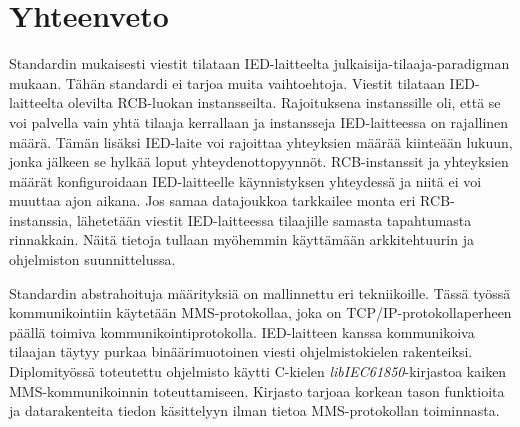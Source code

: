 \section{Yhteenveto}
Standardin mukaisesti viestit tilataan IED-laitteelta julkaisija-tilaaja-paradigman mukaan. Tähän standardi ei tarjoa muita vaihtoehtoja. Viestit tilataan IED-laitteelta olevilta RCB-luokan instansseilta. Rajoituksena instanssille oli, että se voi palvella vain yhtä tilaaja kerrallaan ja instansseja IED-laitteessa on rajallinen määrä. Tämän lisäksi IED-laite voi rajoittaa yhteyksien määrää kiinteään lukuun, jonka jälkeen se hylkää loput yhteydenottopyynnöt. RCB-instanssit ja yhteyksien määrät konfiguroidaan IED-laitteelle käynnistyksen yhteydessä ja niitä ei voi muuttaa ajon aikana. Jos samaa datajoukkoa tarkkailee monta eri RCB-instanssia, lähetetään viestit IED-laitteessa tilaajille samasta tapahtumasta rinnakkain. Näitä tietoja tullaan myöhemmin käyttämään arkkitehtuurin ja ohjelmiston suunnittelussa.

Standardin abstrahoituja määrityksiä on mallinnettu eri tekniikoille. Tässä työssä kommunikointiin käytetään MMS-protokollaa, joka on TCP/IP-protokollaperheen päällä toimiva kommunikointiprotokolla. IED-laitteen kanssa kommunikoiva tilaajan täytyy purkaa binäärimuotoinen viesti ohjelmistokielen rakenteiksi. Diplomityössä toteutettu ohjelmisto käytti C-kielen \emph{libIEC61850}-kirjastoa kaiken MMS-kommunikoinnin toteuttamiseen. Kirjasto tarjoaa korkean tason funktioita ja datarakenteita tiedon käsittelyyn ilman tietoa MMS-protokollan toiminnasta. \mbox{\cite{IEC61850-8-1}}